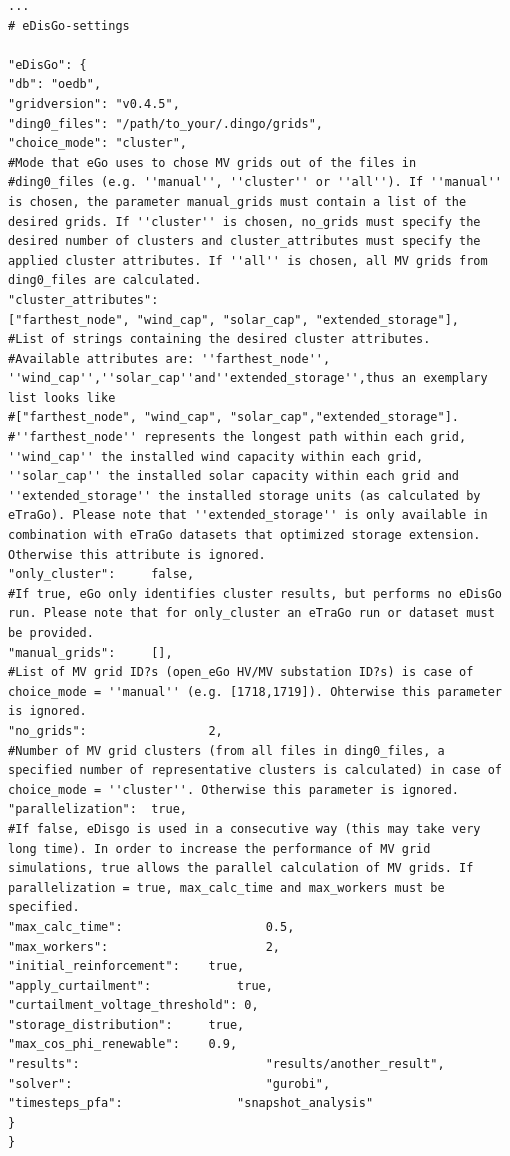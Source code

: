 \documentclass[
a4paper,     %
12pt         %
]{scrartcl}  %
\begin{document}
\begin{lstlisting}
...
# eDisGo-settings

"eDisGo": {
"db": "oedb",
"gridversion": "v0.4.5",
"ding0_files": "/path/to_your/.dingo/grids",
"choice_mode": "cluster",
#Mode that eGo uses to chose MV grids out of the files in
#ding0_files (e.g. ''manual'', ''cluster'' or ''all''). If ''manual'' is chosen, the parameter manual_grids must contain a list of the desired grids. If ''cluster'' is chosen, no_grids must specify the desired number of clusters and cluster_attributes must specify the applied cluster attributes. If ''all'' is chosen, all MV grids from ding0_files are calculated.
"cluster_attributes":																									 	 	["farthest_node", "wind_cap", "solar_cap", "extended_storage"],
#List of strings containing the desired cluster attributes.
#Available attributes are: ''farthest_node'', ''wind_cap'',''solar_cap''and''extended_storage'',thus an exemplary list looks like
#["farthest_node", "wind_cap", "solar_cap","extended_storage"].
#''farthest_node'' represents the longest path within each grid, ''wind_cap'' the installed wind capacity within each grid, ''solar_cap'' the installed solar capacity within each grid and ''extended_storage'' the installed storage units (as calculated by eTraGo). Please note that ''extended_storage'' is only available in combination with eTraGo datasets that optimized storage extension. Otherwise this attribute is ignored.
"only_cluster": 	false,
#If true, eGo only identifies cluster results, but performs no eDisGo run. Please note that for only_cluster an eTraGo run or dataset must be provided.
"manual_grids": 	[],
#List of MV grid ID?s (open_eGo HV/MV substation ID?s) is case of choice_mode = ''manual'' (e.g. [1718,1719]). Ohterwise this parameter is ignored.
"no_grids": 				2,
#Number of MV grid clusters (from all files in ding0_files, a specified number of representative clusters is calculated) in case of choice_mode = ''cluster''. Otherwise this parameter is ignored.
"parallelization":	true,
#If false, eDisgo is used in a consecutive way (this may take very long time). In order to increase the performance of MV grid simulations, true allows the parallel calculation of MV grids. If parallelization = true, max_calc_time and max_workers must be specified.
"max_calc_time": 					0.5,
"max_workers":						2,
"initial_reinforcement":	true,
"apply_curtailment":			true,
"curtailment_voltage_threshold": 0,
"storage_distribution":		true,
"max_cos_phi_renewable": 	0.9,
"results": 							"results/another_result",
"solver": 							"gurobi",
"timesteps_pfa": 				"snapshot_analysis"
}
}
\end{lstlisting}
\end{document}
